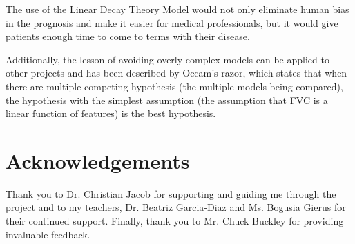 \documentclass[12pt]{article}
\begin{document}

The use of the Linear Decay Theory Model would not only eliminate human bias in the prognosis and make it easier for medical professionals, but it would give patients enough time to come to terms with their disease. %

Additionally, the lesson of avoiding overly complex models can be applied to other projects and has been described by Occam's razor, which states that when there are multiple competing hypothesis (the multiple models being compared), the hypothesis with the simplest assumption (the assumption that FVC is a linear function of features) is the best hypothesis.

\section{Acknowledgements}

Thank you to Dr. Christian Jacob for supporting and guiding me through the project and to my teachers, Dr. Beatriz Garcia-Diaz and Ms. Bogusia Gierus for their continued support.
Finally, thank you to Mr. Chuck Buckley for providing invaluable feedback.

\printbibliography
\end{document}
